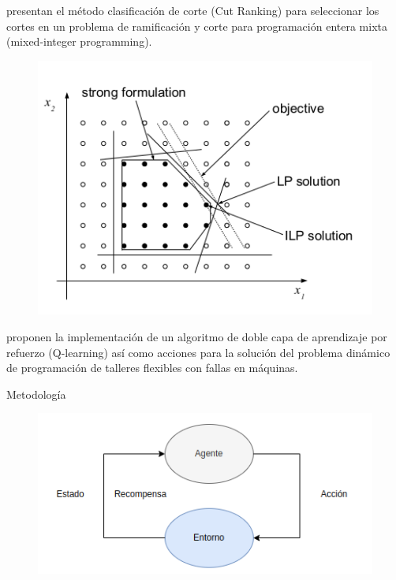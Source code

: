 \documentclass{beamer}
\begin{document}
\begin{frame}{}
\centering  \cite{HUANG2022108353} presentan el método clasificación de corte (Cut Ranking) para seleccionar los cortes en un problema de ramificación y corte para programación entera mixta (mixed-integer programming).

\begin{figure}
	\centering
	\includegraphics[scale = 0.4]{MIP}
\end{figure}

\end{frame}

\begin{frame}{}
	\cite{zhao2019improved} proponen la implementación de un algoritmo de doble capa de aprendizaje por refuerzo (Q-learning) así como acciones para la solución del problema dinámico de programación de talleres flexibles con fallas en máquinas.
\end{frame}

\begin{frame}{Metodología}

    \begin{figure}[h!t]
    \centering
    \includegraphics[scale = 0.7 ]{diagrama}
    \end{figure}

\end{frame}
\end{document}
